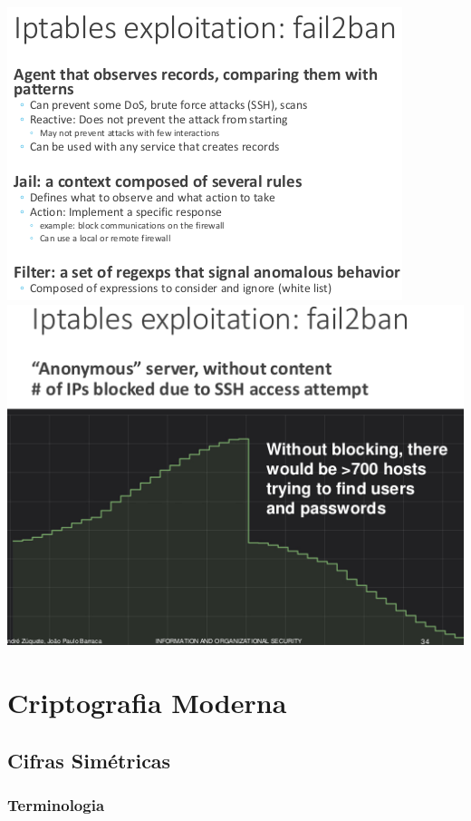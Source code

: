 \documentclass{article}
\begin{document}
\begin{center}
  \includegraphics[scale=0.35]{65}
  \includegraphics[scale=0.35]{66}
\end{center}

\pagebreak

\section{Criptografia Moderna} 

\subsection{Cifras Simétricas}

\subsubsection{Terminologia}
\end{document}
